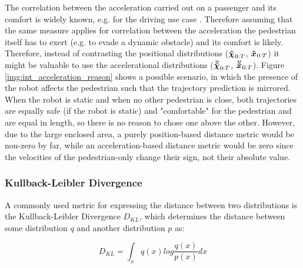 The correlation between the acceleration carried out on a passenger and its comfort is widely known, e.g. for the driving use case \cite{Hoberock1976}. Therefore assuming that the same measure applies for correlation between the acceleration the pedestrian itself has to exert (e.g. to evade a dynamic obstacle) and its comfort is likely. Therefore, instead of contrasting the positional distributions ($\xpedwo[]_{0:T}$, $\xped[]_{0:T}$) it might be valuable to use the accelerational distributions ($\ddxpedwo[]_{0:T}$, $\ddxped[]_{0:T}$). Figure \ref{img:int_acceleration_reason} shows a possible scenario, in which the presence of the robot affects the pedestrian such that the trajectory prediction is mirrored. When the robot is static and when no other pedestrian is close, both trajectories are equally safe (if the robot is static)  and "comfortable" for the pedestrian and are equal in length, so there is no reason to chose one above the other. However, due to the large enclosed area, a purely position-based distance metric would be non-zero by far, while an acceleration-based distance metric would be zero since the velocities of the pedestrian-only change their sign, not their absolute value.

\subsubsection{Kullback-Leibler Divergence}
A commonly used metric for expressing the distance between two distributions is the Kullback-Leibler Divergence $D_{KL}$, which determines the distance between  some distribution $q$ and another distribution $p$ as:

\begin{equation}
D_{KL} = \int_x q(x) log \frac{q(x)}{p(x)} dx    
\end{equation}

